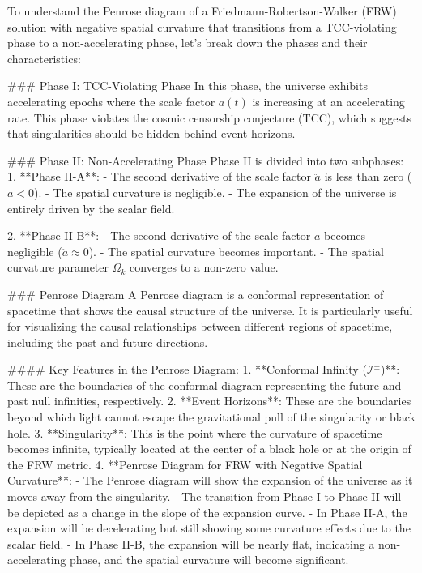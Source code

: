 To understand the Penrose diagram of a Friedmann-Robertson-Walker (FRW) solution with negative spatial curvature that transitions from a TCC-violating phase to a non-accelerating phase, let's break down the phases and their characteristics:

### Phase I: TCC-Violating Phase
In this phase, the universe exhibits accelerating epochs where the scale factor \(a(t)\) is increasing at an accelerating rate. This phase violates the cosmic censorship conjecture (TCC), which suggests that singularities should be hidden behind event horizons.

### Phase II: Non-Accelerating Phase
Phase II is divided into two subphases:
1. **Phase II-A**: 
   - The second derivative of the scale factor \(\ddot{a}\) is less than zero (\(\ddot{a} < 0\)).
   - The spatial curvature is negligible.
   - The expansion of the universe is entirely driven by the scalar field.

2. **Phase II-B**:
   - The second derivative of the scale factor \(\ddot{a}\) becomes negligible (\(\ddot{a} \approx 0\)).
   - The spatial curvature becomes important.
   - The spatial curvature parameter \(\Omega_k\) converges to a non-zero value.

### Penrose Diagram
A Penrose diagram is a conformal representation of spacetime that shows the causal structure of the universe. It is particularly useful for visualizing the causal relationships between different regions of spacetime, including the past and future directions.

#### Key Features in the Penrose Diagram:
1. **Conformal Infinity (\(\mathscr{I}^{\pm}\))**: These are the boundaries of the conformal diagram representing the future and past null infinities, respectively.
2. **Event Horizons**: These are the boundaries beyond which light cannot escape the gravitational pull of the singularity or black hole.
3. **Singularity**: This is the point where the curvature of spacetime becomes infinite, typically located at the center of a black hole or at the origin of the FRW metric.
4. **Penrose Diagram for FRW with Negative Spatial Curvature**:
   - The Penrose diagram will show the expansion of the universe as it moves away from the singularity.
   - The transition from Phase I to Phase II will be depicted as a change in the slope of the expansion curve.
   - In Phase II-A, the expansion will be decelerating but still showing some curvature effects due to the scalar field.
   - In Phase II-B, the expansion will be nearly flat, indicating a non-accelerating phase, and the spatial curvature will become significant.

